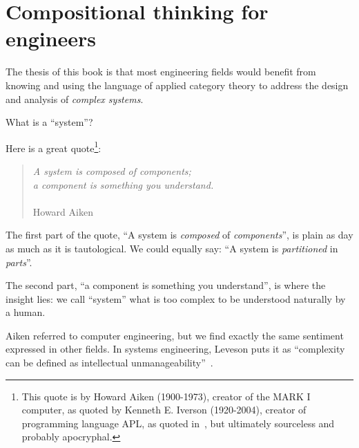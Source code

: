 
\section[Compositionality for engineers]{Compositional thinking for engineers}
\label{sec:compositionality-for-engineers}

The thesis of this book is that most engineering fields would benefit from knowing and using the language of applied category theory to address the design and analysis of \emph{complex systems}.


\label{subsec:introduction-systems-and-components}

What is a ``system''?

Here is a great quote\footnote{
    This quote is by Howard Aiken (1900-1973), creator of the MARK I computer,
    as quoted by Kenneth E.
    Iverson (1920-2004), creator of programming language APL,
    as quoted in~\cite{McIntyre1999Role}, but ultimately sourceless and probably apocryphal.
}:

\begin{quote}
    \emph{A system is composed of components; \\
        a component is something you understand.}\\ \\
    Howard Aiken
\end{quote}

The first part of the quote, ``A system is \emph{composed} of \emph{components}'', is plain as day as much as it is tautological.
We could equally say: ``A system is \emph{partitioned} in \emph{parts}''.

The second part, ``a component is something you understand'', is where the insight lies: we call ``system'' what is too complex to be understood naturally by a human.

Aiken referred to computer engineering, but we find exactly the same sentiment expressed in other fields.
In systems engineering, Leveson puts it as ``complexity can be defined as intellectual unmanageability''~\cite{leveson12engineering}.

